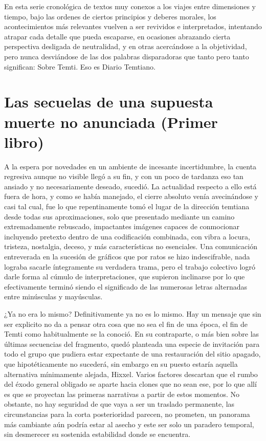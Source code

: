 \documentclass[
]{book}
\begin{document}
En esta serie cronológica de textos muy conexos a los viajes entre dimensiones y tiempo, bajo las ordenes de ciertos principios y deberes morales, los acontecimientos más relevantes vuelven a ser revividos e interpretados, intentando atrapar cada detalle que pueda escaparse, en ocasiones abrazando cierta perspectiva desligada de neutralidad, y en otras acercándose a la objetividad, pero nunca desviándose de las dos palabras disparadoras que tanto pero tanto significan: Sobre Temti. Eso es Diario Temtiano.

\hypertarget{las-secuelas-de-una-supuesta-muerte-no-anunciada-primer-libro}{%
\chapter{Las secuelas de una supuesta muerte no anunciada (Primer libro)}\label{las-secuelas-de-una-supuesta-muerte-no-anunciada-primer-libro}}

A la espera por novedades en un ambiente de incesante incertidumbre, la cuenta regresiva aunque no visible llegó a su fin, y con un poco de tardanza eso tan ansiado y no necesariamente deseado, sucedió. La actualidad respecto a ello está fuera de hora, y como se había manejado, el cierre absoluto venía avecinándose y casi tal cual, fue lo que repentinamente tomó el lugar de la dirección temtiana desde todas sus aproximaciones, solo que presentado mediante un camino extremadamente rebuscado, impactantes imágenes capaces de conmocionar incluyendo pretexto dentro de una codificación combinada, con vibra a locura, tristeza, nostalgia, deceso, y más características no esenciales. Una comunicación entreverada en la sucesión de gráficos que por ratos se hizo indescifrable, nada lograba sacarle íntegramente su verdadera trama, pero el trabajo colectivo logró darle forma al cúmulo de interpretaciones, que supieron inclinarse por lo que efectivamente terminó siendo el significado de las numerosas letras alternadas entre minúsculas y mayúsculas.

¿Ya no era lo mismo? Definitivamente ya no es lo mismo. Hay un mensaje que sin ser explicito no da a pensar otra cosa que no sea el fin de una época, el fin de Temti como habitualmente se la conoció. En su contraparte, o más bien sobre las últimas secuencias del fragmento, quedó planteada una especie de invitación para todo el grupo que pudiera estar expectante de una restauración del sitio apagado, que hipotéticamente no sucederá, sin embargo en su puesto estaría aquella alternativa mínimamente alejada, Hixxel. Varios factores descartan que el rumbo del éxodo general obligado se aparte hacia clones que no sean ese, por lo que allí es que se proyectan las primeras narrativas a partir de estos momentos. No obstante, no hay seguridad de que vaya a ser un traslado permanente, las circunstancias para la corta posterioridad parecen, no prometen, un panorama más cambiante aún podría estar al asecho y este ser solo un paradero temporal, sin desmerecer su sostenida estabilidad donde se encuentra.
\end{document}
